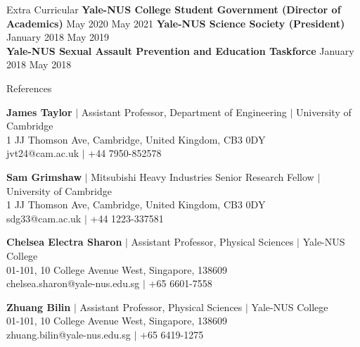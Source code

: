 \begin{rSection}{Extra Curricular}
\textbf{Yale-NUS College Student Government (Director of Academics)} \hfill May 2020 {\textendash}  May 2021
\textbf{Yale-NUS Science Society (President)} \hfill  January 2018 {\textendash}  May 2019 \\
\textbf{Yale-NUS Sexual Assault Prevention and Education Taskforce} \hfill January 2018 {\textendash}  May 2018 
\end{rSection}



\begin{rSection}{References}


\textbf{James Taylor} $|$ 
Assistant Professor, Department of Engineering $|$
University of Cambridge\\
1 JJ Thomson Ave, Cambridge, United Kingdom, CB3 0DY\\
jvt24@cam.ac.uk $|$ 
+44 7950-852578

\textbf{Sam Grimshaw} $|$ 
Mitsubishi Heavy Industries Senior Research Fellow $|$
University of Cambridge\\
1 JJ Thomson Ave, Cambridge, United Kingdom, CB3 0DY\\
sdg33@cam.ac.uk $|$ 
+44 1223-337581


\textbf{Chelsea Electra Sharon} $|$
Assistant Professor, Physical Sciences $|$
Yale-NUS College\\
01-101, 10 College Avenue West, Singapore, 138609\\
chelsea.sharon@yale-nus.edu.sg $|$
+65 6601-7558


\textbf{Zhuang Bilin} $|$
Assistant Professor, Physical Sciences $|$
Yale-NUS College\\
01-101, 10 College Avenue West, Singapore, 138609\\
zhuang.bilin@yale-nus.edu.sg $|$
+65 6419-1275



\end{rSection}
